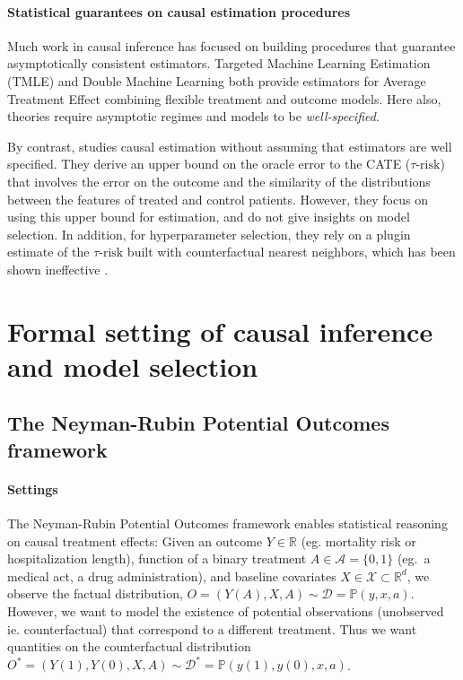 \documentclass[10pt]{article}
\begin{document}
\begin{multicols}{2}
    \paragraph{Statistical guarantees on causal estimation procedures}

    Much work in causal inference has focused on building procedures that
    guarantee asymptotically consistent estimators. Targeted Machine Learning
    Estimation (TMLE) \cite{laan_targeted_2011,schuler_targeted_2017} and
    Double Machine Learning \cite{chernozhukov_double_2018} both provide
    estimators for Average Treatment Effect combining flexible treatment and
    outcome models. Here also, theories require asymptotic regimes and
    models to be \textit{well-specified}.

    By contrast, \citet{johansson_generalization_2021} studies causal
    estimation without assuming that estimators are well specified. They derive an
    upper bound on the oracle error to the CATE ($\tau\text{-risk}$) that involves
    the error on the outcome and the similarity of the distributions between the
    features of treated and control patients. However, they focus on using this
    upper bound for estimation, and do not give insights on model selection. In
    addition, for hyperparameter selection, they rely on a plugin estimate of the $\tau\text{-risk}$ built with
    counterfactual nearest neighbors, which has been shown ineffective
    \cite{schuler_comparison_2018}.

    \section{Formal setting of causal inference and model selection}\label{sec:framework}

    \subsection{The Neyman-Rubin Potential Outcomes framework}%
    \label{sec:neyman_rubin}%

    \paragraph{Settings}

    The Neyman-Rubin Potential Outcomes framework
    \cite{naimi2023defining,imbens_causal_2015} enables statistical
    reasoning on causal treatment effects: Given an outcome $Y \in \mathbb R$ (eg.
    mortality risk or hospitalization length), function of a binary treatment $A \in
        \mathcal{A} = \{0, 1\}$ (eg.~a medical act, a drug administration), and baseline
    covariates $X \in \mathcal{X} \subset \mathbb{R}^d$, we observe the factual
    distribution,
    $O = (Y(A), X, A) \sim \mathcal D = \mathbb P(y, x, a)$. However, we want to model the existence of potential observations
    (unobserved ie. counterfactual) that correspond to a different treatment. Thus we want
    quantities on the counterfactual distribution
    $O^{*} = (Y(1), Y(0), X, A) \sim \mathcal D^{*} = \mathbb P(y(1), y(0), x, a)$.


\end{multicols}
\end{document}

